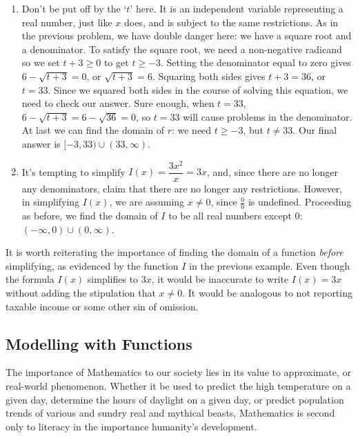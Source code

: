 {\begin{enumerate}
\item    Don't be put off by the `$t$' here. It is an independent variable representing a real number, just like $x$ does, and is subject to the same restrictions.  As in the previous problem, we have double danger here:  we have a square root and a denominator.   To satisfy the square root, we need a non-negative radicand so we set $t + 3 \geq 0$ to get $t \geq -3$.  Setting the denominator equal to zero gives $6 - \sqrt{t+3} =0$, or $\sqrt{t+3} = 6$.  Squaring both sides gives $t+3 = 36$, or $t = 33$. Since we squared both sides in the course of solving this equation, we need to check our answer.  Sure enough, when $t=33$, $6 - \sqrt{t+3} = 6 - \sqrt{36} = 0$, so $t=33$ will cause problems in the denominator.  At last we can find the domain of $r$:  we need $t \geq -3$, but $t \neq 33$.  Our final answer is  $[-3, 33) \cup (33, \infty)$.


\item  It's tempting to simplify $I(x) = \dfrac{3x^2}{x} = 3x$, and, since there are no longer any denominators, claim that there are no longer any restrictions.  However, in simplifying $I(x)$, we are assuming $x \neq 0$, since $\frac{0}{0}$ is undefined. Proceeding as before, we find the domain of $I$ to be all real numbers except $0$:  $(-\infty, 0) \cup (0, \infty)$.  
\end{enumerate}
}

\medskip

It is worth reiterating the importance of finding the domain of a function \emph{before} simplifying, as evidenced by the function $I$ in the previous example.  Even though the formula $I(x)$ simplifies to $3x$, it would be inaccurate to write $I(x) = 3x$ without adding the stipulation that $x \neq 0$. It would be analogous to not reporting taxable income or some other sin of omission.

\subsection{Modelling with Functions} \label{modeling}

The importance of Mathematics to our society lies in its value to approximate, or  real-world phenomenon.  Whether it be used to predict the high temperature on a given day, determine the hours of daylight on a given day, or predict population trends of various and sundry real and mythical beasts, Mathematics is second only to literacy in the importance humanity's development.

